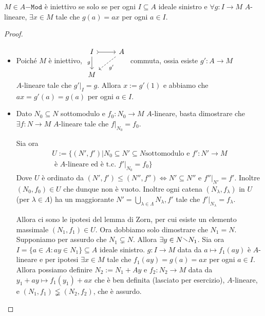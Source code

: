 \begin{proposition}{}
    \(M \in A\mathtt{-Mod}\) è iniettivo se solo se per ogni \(I \subseteq A \)
    ideale sinistro e \(\forall g : I \to M\) \(A\)-lineare, \(\exists x \in M\)
    tale che \(g{(a)} = ax\) per ogni \(a \in I\).
\end{proposition}
\begin{proof}\( \)
\begin{itemize}
    \item[\(\implies \)] Poiché \(M\) è iniettivo, \(\begin{tikzcd}
	I & A \\
	M
	\arrow[tail, from=1-1, to=1-2]
	\arrow["g"', from=1-1, to=2-1]
	\arrow["{g'}", dashed, from=1-2, to=2-1]
\end{tikzcd}\) commuta, ossia esiste \(g': A \to M\) \\\(A\)-lineare tale che
\(g'|_I = g\). Allora \(x := g'{(1)}\) e abbiamo che \(ax = g'{(a)} =g{(a)}\)
per ogni \(a \in I\).
    \item[\(\impliedby \)] Dato \(N_{0} \subseteq N \) sottomodulo e \(f_{0} :
        N_{0} \to M\) \(A\)-lineare, basta dimostrare che \(\exists f : N \to
        M\) \(A\)-lineare tale che \(f|_{N_{0}}  = f_{0}\).

        Sia ora \begin{align*}U := \{{(N', f')} | N_{0} \subseteq N' \subseteq N \text{
        sottomodulo e } f' : N' \to M \\\text{ è \(A\)-lineare ed è t.c. }
f'|_{N_{0}} =f_{0}\}\end{align*}
        Dove \(U\) è ordinato da \({(N', f')} \le {(N'', f'')} \iff N' \subseteq
        N''\) e \(f''|_{N'} = f'\).
        Inoltre \({(N_{0}, f_{0})} \in U\) che dunque non è vuoto. Inoltre ogni
        catena \({(N_\lambda, f_\lambda)}\) in \(U\) (per \(\lambda \in
        \Lambda\)) ha un maggiorante \(N' = \bigcup_{\lambda \in \Lambda}
        N_{\lambda}, f'\) tale che \(f'|_{N_{\lambda} } = f_{\lambda} \). %
        
        Allora ci sono le ipotesi del lemma di Zorn, per cui esiste un elemento
        massimale \({(N_{1}, f_{1})}\in U\). Ora dobbiamo solo dimostrare che
        \(N_{1} = N\). Supponiamo per assurdo che \(N_{1} \subsetneq N\). Allora
        \(\exists y \in N \sminus N_{1}\). Sia ora \(I = \{a \in A : ay \in
        N_{1}\} \subseteq A \) ideale sinistro. \(g : I \to M\) data da \(a
        \mapsto f_{1}{(ay)}\) è \(A\)-lineare e per ipotesi \(\exists x \in M\)
        tale che \(f_{1}{(ay)} = g{(a)} = ax\) per ogni \(a \in I\). Allora
        possiamo definire \(N_{2} := N_{1} + Ay\) e \(f_{2} : N_{2} \to M\) data
        da \(y_{1} + ay \mapsto f_{1}{(y_{1})} + ax\) che è ben definita
        (lasciato per esercizio), \(A\)-lineare, e \({(N_{1}, f_{1})} \lneqq
        {(N_{2}, f_{2})}\), che è assurdo.
        
\end{itemize}
\end{proof}

